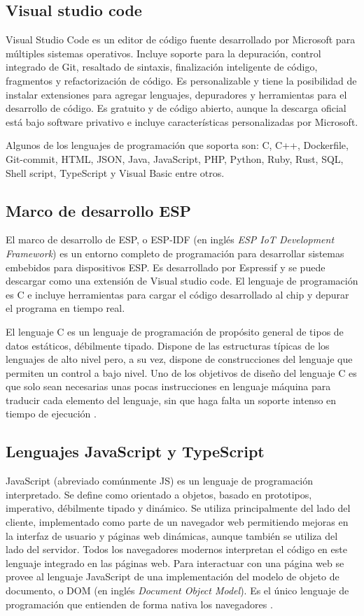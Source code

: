 \subsection{Visual studio code}

Visual Studio Code es un editor de código fuente desarrollado por Microsoft para múltiples sistemas operativos. Incluye soporte para la depuración, control integrado de Git, resaltado de sintaxis, finalización inteligente de código, fragmentos y refactorización de código. Es personalizable y tiene la posibilidad de instalar extensiones para agregar lenguajes, depuradores y herramientas para el desarrollo de código. Es gratuito y de código abierto, aunque la descarga oficial está bajo software privativo e incluye características personalizadas por Microsoft.

Algunos de los lenguajes de programación que soporta son: C, C++, Dockerfile, Git-commit, HTML, JSON, Java, JavaScript, PHP, Python, Ruby, Rust, SQL, Shell script, TypeScript y Visual Basic entre otros.

\subsection{Marco de desarrollo ESP}

El marco de desarrollo de ESP, o ESP-IDF (en inglés \textit{ESP IoT Development Framework}) es un entorno completo de programación para desarrollar sistemas embebidos para dispositivos ESP. Es desarrollado por Espressif y se puede descargar como una extensión de Visual studio code. El lenguaje de programación es C e incluye herramientas para cargar el código desarrollado al chip y depurar el programa en tiempo real.

El lenguaje C es un lenguaje de programación de propósito general de tipos de datos estáticos, débilmente tipado. Dispone de las estructuras típicas de los lenguajes de alto nivel pero, a su vez, dispone de construcciones del lenguaje que permiten un control a bajo nivel. Uno de los objetivos de diseño del lenguaje C es que solo sean necesarias unas pocas instrucciones en lenguaje máquina para traducir cada elemento del lenguaje, sin que haga falta un soporte intenso en tiempo de ejecución \citep{13}.

\subsection{Lenguajes JavaScript y TypeScript}

JavaScript (abreviado comúnmente JS) es un lenguaje de programación interpretado. Se define como orientado a objetos, basado en prototipos, imperativo, débilmente tipado y dinámico. Se utiliza principalmente del lado del cliente, implementado como parte de un navegador web permitiendo mejoras en la interfaz de usuario y páginas web dinámicas, aunque también se utiliza del lado del servidor. Todos los navegadores modernos interpretan el código en este lenguaje integrado en las páginas web. Para interactuar con una página web se provee al lenguaje JavaScript de una implementación del modelo de objeto de documento, o DOM (en inglés \textit{Document Object Model}). Es el único lenguaje de programación que entienden de forma nativa los navegadores \citep{14}.

